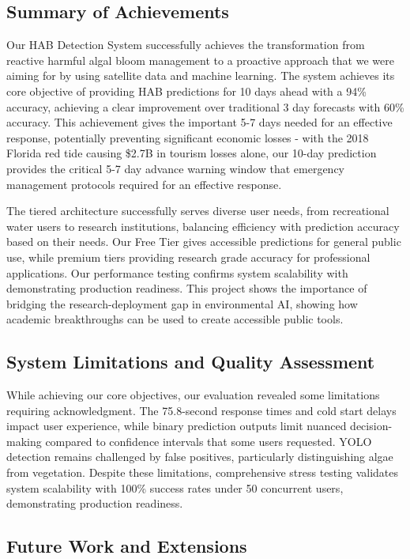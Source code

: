 \documentclass[conference]{IEEEtran}
\begin{document}
\subsection{Summary of Achievements}

Our HAB Detection System successfully achieves the transformation from reactive harmful algal bloom management to a proactive approach that we were aiming for by using satellite data and machine learning. The system achieves its core objective of providing HAB predictions for 10 days ahead with a 94\% accuracy, achieving a clear improvement over traditional 3 day forecasts with 60\% accuracy. This achievement gives the important 5-7 days needed for an effective response, potentially preventing significant economic losses - with the 2018 Florida red tide causing \$2.7B in tourism losses alone, our 10-day prediction provides the critical 5-7 day advance warning window that emergency management protocols required for an effective response.  

The tiered architecture successfully serves diverse user needs, from recreational water users to research institutions, balancing efficiency with prediction accuracy based on their needs. Our Free Tier gives accessible predictions for general public use, while premium tiers providing research grade accuracy for professional applications. Our performance testing confirms system scalability with demonstrating production readiness. This project shows the importance of bridging the research-deployment gap in environmental AI, showing how academic breakthroughs can be used to create accessible public tools.

\subsection{System Limitations and Quality Assessment}

While achieving our core objectives, our evaluation revealed some limitations requiring acknowledgment. The 75.8-second response times and cold start delays impact user experience, while binary prediction outputs limit nuanced decision-making compared to confidence intervals that some users requested. YOLO detection remains challenged by false positives, particularly distinguishing algae from vegetation. Despite these limitations, comprehensive stress testing validates system scalability with 100\% success rates under 50 concurrent users, demonstrating production readiness.

\subsection{Future Work and Extensions}
\end{document}
